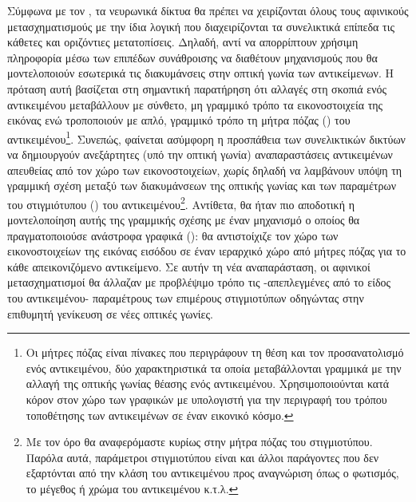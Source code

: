 Σύμφωνα με τον \cite{youtubeHinton}, τα νευρωνικά δίκτυα θα πρέπει να χειρίζονται όλους τους αφινικούς μετασχηματισμούς με την ίδια λογική που διαχειρίζονται τα συνελικτικά επίπεδα τις κάθετες και οριζόντιες μετατοπίσεις. Δηλαδή, αντί να απορρίπτουν χρήσιμη πληροφορία μέσω των επιπέδων συνάθροισης να διαθέτουν μηχανισμούς που θα μοντελοποιούν εσωτερικά τις διακυμάνσεις στην οπτική γωνία των αντικείμενων. Η πρόταση αυτή βασίζεται στη σημαντική παρατήρηση ότι αλλαγές στη σκοπιά ενός αντικειμένου μεταβάλλουν με σύνθετο, μη γραμμικό τρόπο τα εικονοστοιχεία της εικόνας ενώ τροποποιούν με απλό, γραμμικό τρόπο τη μήτρα πόζας () του αντικειμένου\footnote{Οι μήτρες πόζας είναι πίνακες που περιγράφουν τη θέση και τον προσανατολισμό ενός αντικειμένου, δύο χαρακτηριστικά τα οποία μεταβάλλονται γραμμικά με την αλλαγή της οπτικής γωνίας θέασης ενός αντικειμένου. Χρησιμοποιούνται κατά κόρον στον χώρο των γραφικών με υπολογιστή για την περιγραφή του τρόπου τοποθέτησης των αντικειμένων σε έναν εικονικό κόσμο.}. Συνεπώς, φαίνεται ασύμφορη η προσπάθεια των συνελικτικών δικτύων να δημιουργούν ανεξάρτητες (υπό την οπτική γωνία) αναπαραστάσεις αντικειμένων απευθείας από τον χώρο των εικονοστοιχείων, χωρίς δηλαδή να λαμβάνουν υπόψη τη γραμμική σχέση μεταξύ των διακυμάνσεων της οπτικής γωνίας και των παραμέτρων του στιγμιότυπου () του αντικειμένου\footnote{Με τον όρο  θα αναφερόμαστε κυρίως στην μήτρα πόζας του στιγμιοτύπου. Παρόλα αυτά, παράμετροι στιγμιοτύπου είναι και άλλοι παράγοντες που δεν εξαρτόνται από την κλάση του αντικειμένου προς αναγνώριση όπως ο φωτισμός, το μέγεθος ή χρώμα του αντικειμένου κ.τ.λ. }. Αντίθετα, θα ήταν πιο αποδοτική η μοντελοποίηση αυτής της γραμμικής σχέσης με έναν μηχανισμό ο οποίος θα πραγματοποιούσε ανάστροφα γραφικά (): θα αντιστοίχιζε τον χώρο των εικονοστοιχείων της εικόνας εισόδου σε έναν ιεραρχικό χώρο από μήτρες πόζας για το κάθε απεικονιζόμενο αντικείμενο. Σε αυτήν τη νέα αναπαράσταση, οι αφινικοί μετασχηματισμοί θα άλλαζαν με προβλέψιμο τρόπο τις -απεπλεγμένες από το είδος του αντικειμένου- παραμέτρους των επιμέρους στιγμιοτύπων οδηγώντας στην επιθυμητή γενίκευση σε νέες οπτικές γωνίες.\par

